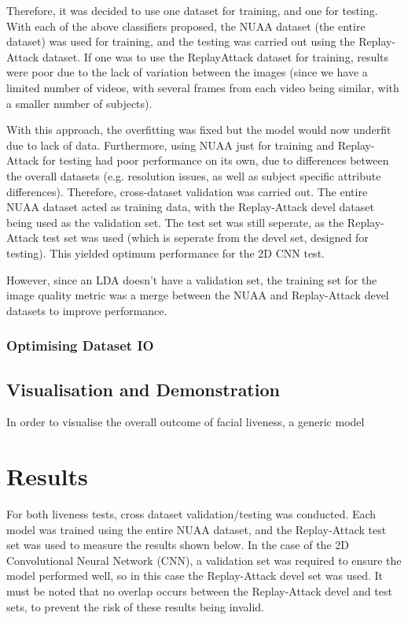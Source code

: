 \documentclass[10pt,a4paper]{article}
\begin{document}
            Therefore, it was decided to use one dataset for training, and one for testing.
            With each of the above classifiers proposed, the NUAA dataset (the entire dataset) was used for training, and the testing was carried out using the Replay-Attack dataset.
            If one was to use the ReplayAttack dataset for training, results were poor due to the lack of variation between the images (since we have a limited number of videos, with several frames from each video being similar, with a smaller number of subjects).
            
            With this approach, the overfitting was fixed but the model would now underfit due to lack of data. Furthermore, using NUAA just for training and Replay-Attack for testing had poor performance on its own, due to differences between the overall datasets (e.g. resolution issues, as well as subject specific attribute differences).
            Therefore, cross-dataset validation was carried out. The entire NUAA dataset acted as training data, with the Replay-Attack devel dataset being used as the validation set. The test set was still seperate, as the Replay-Attack test set was used (which is seperate from the devel set, designed for testing).
            This yielded optimum performance for the 2D CNN test.

            However, since an LDA doesn't have a validation set, the training set for the image quality metric was a merge between the NUAA and Replay-Attack devel datasets to improve performance.

        \subsubsection{Optimising Dataset IO}
       

    \subsection{Visualisation and Demonstration}
        In order to visualise the overall outcome of facial liveness, a generic model 
\section{Results}
    For both liveness tests, cross dataset validation/testing was conducted. Each model was trained using the entire NUAA dataset, and the Replay-Attack test set
    was used to measure the results shown below. In the case of the 2D Convolutional Neural Network (CNN), a validation set was required to ensure the model performed
    well, so in this case the Replay-Attack devel set was used. It must be noted that no overlap occurs between the Replay-Attack devel and test sets, to prevent the risk
    of these results being invalid.
\end{document}
